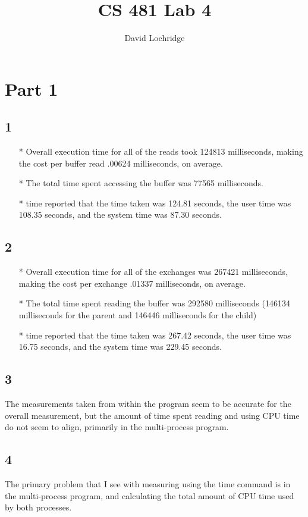 \documentclass[]{scrartcl}
\title{CS 481 Lab 4}
\author{David Lochridge}
\begin{document}
\maketitle

\section*{Part 1}
\subsection*{1}
\begin{itemize}
\item[*] Overall execution time for all of the reads took 124813 milliseconds, making the cost per buffer read .00624 milliseconds, on average.
\item[*] The total time spent accessing the buffer was 77565 milliseconds.
\item[*] time reported that the time taken was 124.81 seconds, the user time was 108.35  seconds, and the system time was 87.30 seconds.
\end{itemize}
\subsection*{2}
\begin{itemize}
\item[*] Overall execution time for all of the exchanges was 267421 milliseconds, making the cost per exchange .01337 milliseconds, on average.
\item[*] The total time spent reading the buffer was 292580 milliseconds (146134 milliseconds for the parent and 146446 milliseconds for the child)
\item[*] time reported that the time taken was 267.42 seconds, the user time was 16.75 seconds, and the system time was 229.45 seconds.
\end{itemize}
\subsection*{3}
The measurements taken from within the program seem to be accurate for the overall measurement, but the amount of time spent reading and using CPU time do not seem to align, primarily in the multi-process program.
\subsection*{4}
The primary problem that I see with measuring using the time command is in the multi-process program, and calculating the total amount of CPU time used by both processes.
\end{document}
